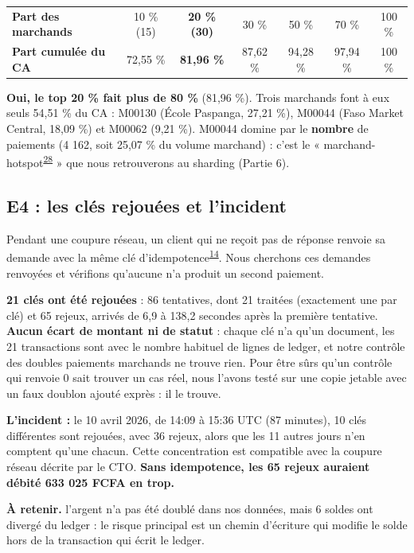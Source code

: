 \documentclass[11pt,a4paper]{article}
\newcommand{\code}[1]{\texttt{\detokenize{#1}}}
\newcommand{\retenir}[1]{\par\smallskip\noindent\colorbox{grisfond}{\parbox{\dimexpr\linewidth-2\fboxsep}{\small\textbf{À retenir.} #1}}\par\smallskip}
\newcommand{\gl}[1]{\textsuperscript{\hyperlink{lex#1}{#1}}}
\begin{document}
	\begin{center}\small
		\begin{tabular}{@{}lcccccc@{}}
			\toprule
			\textbf{Part des marchands} & 10 \% (15) & \textbf{20 \% (30)} & 30 \% & 50 \% & 70 \% & 100 \% \\
			\textbf{Part cumulée du CA} & 72,55 \% & \textbf{81,96 \%} & 87,62 \% & 94,28 \% & 97,94 \% & 100 \% \\
			\bottomrule
		\end{tabular}
	\end{center}
	\textbf{Oui, le top 20 \% fait plus de 80 \%} (81,96 \%). Trois marchands font à eux seuls 54,51 \% du CA : M00130 (École Paspanga, 27,21 \%), M00044 (Faso Market Central, 18,09 \%) et M00062 (9,21 \%). M00044 domine par le \textbf{nombre} de paiements (4 162, soit 25,07 \% du volume marchand) : c'est le « marchand-hotspot\gl{28} » que nous retrouverons au sharding (Partie 6).
	
	\subsection{E4 : les clés rejouées et l'incident}
	Pendant une coupure réseau, un client qui ne reçoit pas de réponse renvoie sa demande avec la même clé d'idempotence\gl{14}. Nous cherchons ces demandes renvoyées et vérifions qu'aucune n'a produit un second paiement.
	
	\textbf{21 clés ont été rejouées} : 86 tentatives, dont 21 traitées (exactement une par clé) et 65 rejeux, arrivés de 6,9 à 138,2 secondes après la première tentative. \textbf{Aucun écart de montant ni de statut} : chaque clé n'a qu'un document, les 21 transactions sont \code{COMPLETED} avec le nombre habituel de lignes de ledger, et notre contrôle des doubles paiements marchands ne trouve rien. Pour être sûrs qu'un contrôle qui renvoie 0 sait trouver un cas réel, nous l'avons testé sur une copie jetable avec un faux doublon ajouté exprès : il le trouve.
	
	\textbf{L'incident :} le 10 avril 2026, de 14:09 à 15:36 UTC (87 minutes), 10 clés différentes sont rejouées, avec 36 rejeux, alors que les 11 autres jours n'en comptent qu'une chacun. Cette concentration est compatible avec la coupure réseau décrite par le CTO. \textbf{Sans idempotence, les 65 rejeux auraient débité 633 025 FCFA en trop.}
	
	\retenir{l'argent n'a pas été doublé dans nos données, mais 6 soldes ont divergé du ledger : le risque principal est un chemin d'écriture qui modifie le solde hors de la transaction qui écrit le ledger.}
	
\end{document}
